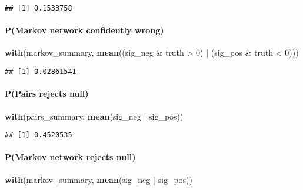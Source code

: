 \documentclass[11pt,]{article}
\newenvironment{Shaded}{\begin{snugshade}}{\end{snugshade}}
\newcommand{\KeywordTok}[1]{\textcolor[rgb]{0.13,0.29,0.53}{\textbf{{#1}}}}
\newcommand{\DecValTok}[1]{\textcolor[rgb]{0.00,0.00,0.81}{{#1}}}
\newcommand{\StringTok}[1]{\textcolor[rgb]{0.31,0.60,0.02}{{#1}}}
\newcommand{\NormalTok}[1]{{#1}}
\let\oldparagraph\paragraph
\renewcommand{\paragraph}[1]{\oldparagraph{#1}\mbox{}}
\begin{document}
\begin{verbatim}
## [1] 0.1533758
\end{verbatim}

\paragraph{P(Markov network confidently
wrong)}\label{pmarkov-network-confidently-wrong}

\begin{Shaded}
\begin{Highlighting}[]
\KeywordTok{with}\NormalTok{(markov_summary, }\KeywordTok{mean}\NormalTok{((sig_neg &}\StringTok{ }\NormalTok{truth >}\StringTok{ }\DecValTok{0}\NormalTok{) |}\StringTok{ }\NormalTok{(sig_pos &}\StringTok{ }\NormalTok{truth <}\StringTok{ }\DecValTok{0}\NormalTok{)))}
\end{Highlighting}
\end{Shaded}

\begin{verbatim}
## [1] 0.02861541
\end{verbatim}

\paragraph{P(Pairs rejects null)}\label{ppairs-rejects-null}

\begin{Shaded}
\begin{Highlighting}[]
\KeywordTok{with}\NormalTok{(pairs_summary,  }\KeywordTok{mean}\NormalTok{(sig_neg |}\StringTok{ }\NormalTok{sig_pos))}
\end{Highlighting}
\end{Shaded}

\begin{verbatim}
## [1] 0.4520535
\end{verbatim}

\paragraph{P(Markov network rejects
null)}\label{pmarkov-network-rejects-null}

\begin{Shaded}
\begin{Highlighting}[]
\KeywordTok{with}\NormalTok{(markov_summary,  }\KeywordTok{mean}\NormalTok{(sig_neg |}\StringTok{ }\NormalTok{sig_pos))}
\end{Highlighting}
\end{Shaded}
\end{document}
